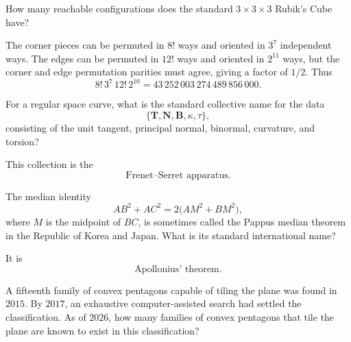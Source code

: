     \begin{expectedproblem}
        How many reachable configurations does the standard $3\times3\times3$
        Rubik's Cube have?
    \end{expectedproblem}

    \begin{solution}
        The corner pieces can be permuted in $8!$ ways and oriented in $3^7$
        independent ways. The edges can be permuted in $12!$ ways and oriented
        in $2^{11}$ ways, but the corner and edge permutation parities must
        agree, giving a factor of $1/2$. Thus
        \[
            8!\,3^7\,12!\,2^{10}
            =
            \boxed{43\,252\,003\,274\,489\,856\,000}.
        \]
    \end{solution}

    \begin{expectedproblem}
        For a regular space curve, what is the standard collective name for the
        data
        \[
            \{\mathbf{T},\mathbf{N},\mathbf{B},\kappa,\tau\},
        \]
        consisting of the unit tangent, principal normal, binormal, curvature,
        and torsion?
    \end{expectedproblem}

    \begin{solution}
        This collection is the
        \[
            \boxed{\text{Frenet--Serret apparatus}}.
        \]
    \end{solution}

    \begin{expectedproblem}
        The median identity
        \[
            AB^2+AC^2
            =
            2\bigl(AM^2+BM^2\bigr),
        \]
        where $M$ is the midpoint of $BC$, is sometimes called the Pappus
        median theorem in the Republic of Korea and Japan. What is its standard international
        name?
    \end{expectedproblem}

    \begin{solution}
        It is
        \[
            \boxed{\text{Apollonius' theorem}}.
        \]
    \end{solution}

    \begin{expectedproblem}
        A fifteenth family of convex pentagons capable of tiling the plane was
        found in $2015$. By $2017$, an exhaustive computer-assisted search had
        settled the classification. As of $2026$, how many families of convex
        pentagons that tile the plane are known to exist in this classification?
    \end{expectedproblem}

